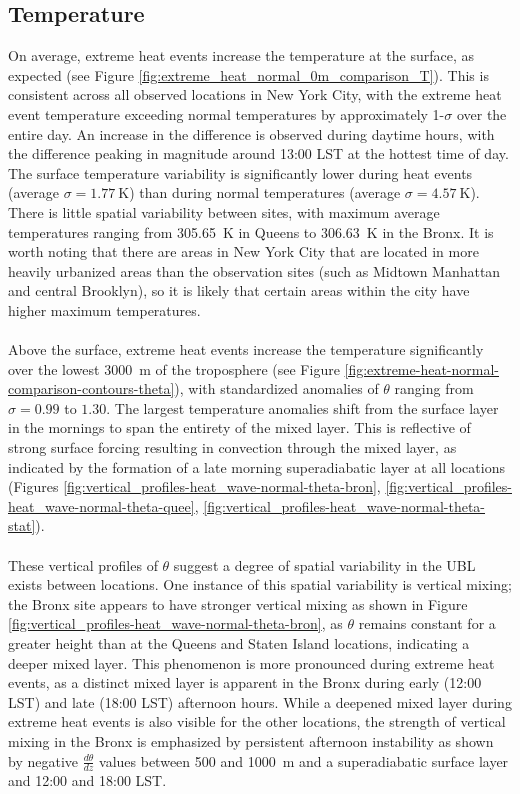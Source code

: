 \documentclass[11pt,a4paper]{article}
\begin{document}
\subsection{Temperature}
On average, extreme heat events increase the temperature at the surface, as expected (see Figure \ref{fig:extreme_heat_normal_0m_comparison_T}). This is consistent across all observed locations in New York City, with the extreme heat event temperature exceeding normal temperatures by approximately 1-$\sigma$ over the entire day. An increase in the difference is observed during daytime hours, with the difference peaking in magnitude around 13:00 LST at the hottest time of day. The surface temperature variability is significantly lower during heat events (average $ \sigma = \SI{1.77}{\kelvin} $) than during normal temperatures (average $ \sigma = \SI{4.57}{\kelvin} $). There is little spatial variability between sites, with maximum average temperatures ranging from \SI{305.65}{\kelvin} in Queens to \SI{306.63}{\kelvin} in the Bronx. It is worth noting that there are areas in New York City that are located in more heavily urbanized areas than the observation sites (such as Midtown Manhattan and central Brooklyn), so it is likely that certain areas within the city have higher maximum temperatures. 
\\ \\
Above the surface, extreme heat events increase the temperature significantly over the lowest \SI{3000}{\meter} of the troposphere (see Figure \ref{fig:extreme-heat-normal-comparison-contours-theta}), with standardized anomalies of $\theta$ ranging from $\sigma = 0.99$ to $1.30$. The largest temperature anomalies shift from the surface layer in the mornings to span the entirety of the mixed layer. This is reflective of strong surface forcing resulting in convection through the mixed layer, as indicated by the formation of a late morning superadiabatic layer at all locations (Figures \ref{fig:vertical_profiles-heat_wave-normal-theta-bron}, \ref{fig:vertical_profiles-heat_wave-normal-theta-quee}, \ref{fig:vertical_profiles-heat_wave-normal-theta-stat}). 
\\ \\
These vertical profiles of $\theta$ suggest a degree of spatial variability in the UBL exists between locations. One instance of this spatial variability is vertical mixing; the Bronx site appears to have stronger vertical mixing as shown in Figure \ref{fig:vertical_profiles-heat_wave-normal-theta-bron}, as $\theta$ remains constant for a greater height than at the Queens and Staten Island locations, indicating a deeper mixed layer. This phenomenon is more pronounced during extreme heat events, as a distinct mixed layer is apparent in the Bronx during early (12:00 LST) and late (18:00 LST) afternoon hours. While a deepened mixed layer during extreme heat events is also visible for the other locations, the strength of vertical mixing in the Bronx is emphasized by persistent afternoon instability as shown by negative $\frac{d\theta}{dz}$ values between 500 and \SI{1000}{\meter} and a superadiabatic surface layer and 12:00 and 18:00 LST.
\end{document}
